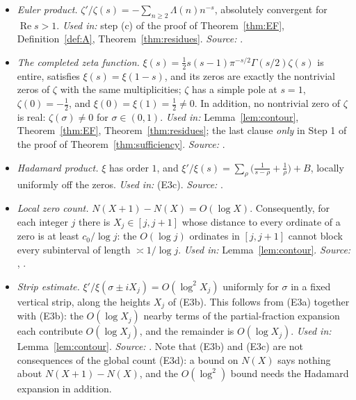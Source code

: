 \documentclass[11pt]{amsart}
\theoremstyle{definition}
\theoremstyle{remark}
\newcommand{\Rel}{\operatorname{Re}}
\begin{document}
\begin{itemize}
\item[\textbf{(E1)}] \emph{Euler product.}
$\zeta'/\zeta(s)=-\sum_{n\ge2}\Lambda(n)n^{-s}$, absolutely convergent for
$\Rel s>1$.  \emph{Used in:} step (c) of the proof of Theorem~\ref{thm:EF},
Definition~\ref{def:A}, Theorem~\ref{thm:residues}.
\emph{Source:} \cite[\S1.1]{IK}.

\item[\textbf{(E2)}] \emph{The completed zeta function.}
$\xi(s)=\tfrac12s(s-1)\pi^{-s/2}\Gamma(s/2)\zeta(s)$ is entire, satisfies
$\xi(s)=\xi(1-s)$, and its zeros are exactly the nontrivial zeros of $\zeta$
with the same multiplicities; $\zeta$ has a simple pole at $s=1$,
$\zeta(0)=-\tfrac12$, and $\xi(0)=\xi(1)=\tfrac12\ne0$.  In addition, no
nontrivial zero of $\zeta$ is real: $\zeta(\sigma)\ne0$ for
$\sigma\in(0,1)$.  \emph{Used in:} Lemma~\ref{lem:contour},
Theorem~\ref{thm:EF}, Theorem~\ref{thm:residues}; the last clause \emph{only}
in Step 1 of the proof of Theorem~\ref{thm:sufficiency}.
\emph{Source:} \cite[\S5.1]{IK}.

\item[\textbf{(E3a)}] \emph{Hadamard product.}  $\xi$ has order $1$, and
$\xi'/\xi(s)=\sum_\rho\bigl(\frac1{s-\rho}+\frac1\rho\bigr)+B$, locally
uniformly off the zeros.  \emph{Used in:} (E3c).
\emph{Source:} \cite[ch.~12]{Davenport}.

\item[\textbf{(E3b)}] \emph{Local zero count.}
$N(X+1)-N(X)=O(\log X)$.  Consequently, for each integer $j$ there is
$X_j\in[j,j+1]$ whose distance to every ordinate of a zero is at least
$c_0/\log j$: the $O(\log j)$ ordinates in $[j,j+1]$ cannot block every
subinterval of length $\asymp1/\log j$.  \emph{Used in:}
Lemma~\ref{lem:contour}.  \emph{Source:} \cite[ch.~15]{Davenport},
.

\item[\textbf{(E3c)}] \emph{Strip estimate.}
$\xi'/\xi(\sigma\pm iX_j)=O(\log^2X_j)$ uniformly for $\sigma$ in a fixed
vertical strip, along the heights $X_j$ of (E3b).  This follows from (E3a)
together with (E3b): the $O(\log X_j)$ nearby terms of the partial-fraction
expansion each contribute $O(\log X_j)$, and the remainder is $O(\log X_j)$.
\emph{Used in:} Lemma~\ref{lem:contour}.
\emph{Source:} \cite[ch.~17]{Davenport}.
Note that (E3b) and (E3c) are not consequences of the global count
(E3d): a bound on $N(X)$ says nothing about $N(X+1)-N(X)$, and the $O(\log^2)$
bound needs the Hadamard expansion in addition.


\end{itemize}
\end{document}

